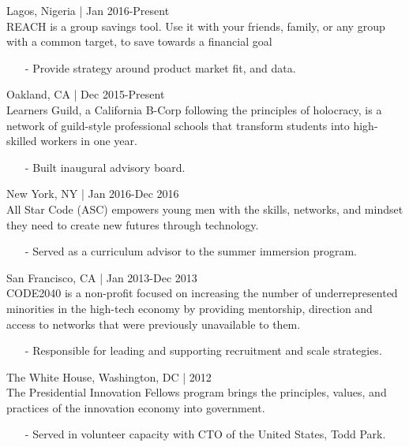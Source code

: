 \documentclass[11pt,article,oneside]{memoir}
\begin{document}
 \hfill Lagos, Nigeria | Jan 2016-Present\\
REACH is a group savings tool. Use it with your friends, family, or any group with a common target, to save towards a financial goal
\begin{itemize}[nolistsep]
\item[-] Provide strategy around product market fit, and data.
\end{itemize}  

 \hfill Oakland, CA | Dec 2015-Present\\
Learners Guild, a California B-Corp following the principles of holocracy, is a network of guild-style professional schools that transform students into high-skilled workers in one year.
\begin{itemize}[noitemsep,nolistsep]
\item[-] Built inaugural advisory board.
\end{itemize}

 \hfill New York, NY | Jan 2016-Dec 2016\\
All Star Code (ASC) empowers young men with the skills, networks, and mindset they need to create new futures through technology. 
\begin{itemize}[noitemsep,nolistsep]
\item[-] Served as a curriculum advisor to the summer immersion program.
\end{itemize}

 \hfill San Francisco, CA | Jan 2013-Dec 2013\\
CODE2040 is a non-profit focused on increasing the number of underrepresented minorities in the high-tech economy by providing mentorship, direction and access to networks that were previously unavailable to them.
\begin{itemize}[nolistsep]
\item[-] Responsible for leading and supporting recruitment and scale strategies.
\end{itemize} 

 \hfill The White House, Washington, DC | 2012\\
The Presidential Innovation Fellows program brings the principles, values, and practices of the innovation economy into government.
\begin{itemize}[nolistsep]
\item[-] Served in volunteer capacity with CTO of the United States, Todd Park.
\end{itemize} 
\end{document}
